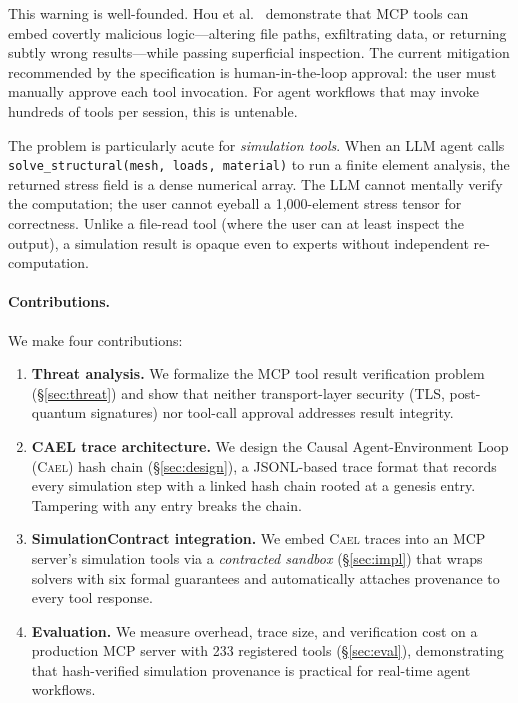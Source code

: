 \documentclass[letterpaper,twocolumn,10pt]{article}
\newcommand{\cael}{\textsc{Cael}}
\begin{document}
\noindent This warning is well-founded. Hou et al.~\cite{hou2025mcp}
demonstrate that MCP tools can embed covertly malicious logic---altering file
paths, exfiltrating data, or returning subtly wrong results---while passing
superficial inspection. The current mitigation recommended by the specification
is human-in-the-loop approval: the user must manually approve each tool
invocation. For agent workflows that may invoke hundreds of tools per session,
this is untenable.

The problem is particularly acute for \emph{simulation tools}. When an LLM
agent calls \texttt{solve\_structural(mesh, loads, material)} to run a finite
element analysis, the returned stress field is a dense numerical array. The
LLM cannot mentally verify the computation; the user cannot eyeball a
1,000-element stress tensor for correctness. Unlike a file-read tool (where
the user can at least inspect the output), a simulation result is opaque even
to experts without independent re-computation.

\paragraph{Contributions.} We make four contributions:

\begin{enumerate}[nosep,leftmargin=*]
\item \textbf{Threat analysis.} We formalize the MCP tool result verification
  problem (\S\ref{sec:threat}) and show that neither transport-layer security
  (TLS, post-quantum signatures) nor tool-call approval addresses result
  integrity.

\item \textbf{CAEL trace architecture.} We design the Causal Agent-Environment
  Loop (\cael{}) hash chain (\S\ref{sec:design}), a JSONL-based trace format
  that records every simulation step with a linked hash chain rooted at a
  genesis entry. Tampering with any entry breaks the chain.

\item \textbf{SimulationContract integration.} We embed \cael{} traces into
  an MCP server's simulation tools via a \emph{contracted sandbox}
  (\S\ref{sec:impl}) that wraps solvers with six formal guarantees and
  automatically attaches provenance to every tool response.

\item \textbf{Evaluation.} We measure overhead, trace size, and verification
  cost on a production MCP server with 233 registered tools
  (\S\ref{sec:eval}), demonstrating that hash-verified simulation provenance
  is practical for real-time agent workflows.
\end{enumerate}
\end{document}
